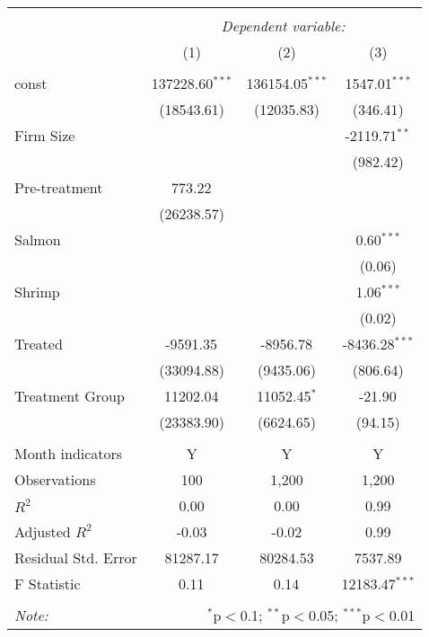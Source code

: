 
\begin{tabular}{@{\extracolsep{5pt}}lccc}
\\[-1.8ex]\hline
\hline \\[-1.8ex]
& \multicolumn{3}{c}{\textit{Dependent variable:}} \
\cr \cline{3-4}
\\[-1.8ex] & (1) & (2) & (3) \\
\hline \\[-1.8ex]
 const & 137228.60$^{***}$ & 136154.05$^{***}$ & 1547.01$^{***}$ \\
  & (18543.61) & (12035.83) & (346.41) \\
 Firm Size & & & -2119.71$^{**}$ \\
  & & & (982.42) \\
 Pre-treatment & 773.22$^{}$ & & \\
  & (26238.57) & & \\
 Salmon & & & 0.60$^{***}$ \\
  & & & (0.06) \\
 Shrimp & & & 1.06$^{***}$ \\
  & & & (0.02) \\
 Treated & -9591.35$^{}$ & -8956.78$^{}$ & -8436.28$^{***}$ \\
  & (33094.88) & (9435.06) & (806.64) \\
 Treatment Group & 11202.04$^{}$ & 11052.45$^{*}$ & -21.90$^{}$ \\
  & (23383.90) & (6624.65) & (94.15) \\
\hline \\[-1.8ex]
 Month indicators & Y & Y & Y \\
 Observations & 100 & 1,200 & 1,200 \\
 $R^2$ & 0.00 & 0.00 & 0.99 \\
 Adjusted $R^2$ & -0.03 & -0.02 & 0.99 \\
 Residual Std. Error & 81287.17 & 80284.53 & 7537.89  \\
 F Statistic & 0.11$^{}$  & 0.14$^{}$  & 12183.47$^{***}$  \\
\hline
\hline \\[-1.8ex]
\textit{Note:} & \multicolumn{3}{r}{$^{*}$p$<$0.1; $^{**}$p$<$0.05; $^{***}$p$<$0.01} \\
\end{tabular}

